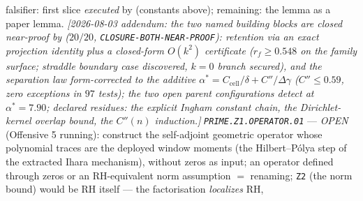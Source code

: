 \documentclass[11pt,a4paper]{article}
\begin{document}
falsifier: first slice \emph{executed} by
 (constants above); remaining:
the lemma as a paper lemma.  \emph{[2026-08-03 addendum: the two
named building blocks are closed near-proof by
 ($20/20$,
\texttt{CLOSURE-BOTH-NEAR-PROOF}): retention via an exact projection
identity plus a closed-form $O(k^2)$ certificate ($r_f\ge0.548$ on
the family surface; straddle boundary case discovered, $k=0$ branch
secured), and the separation law \emph{form-corrected} to the
additive $\alpha^*=C_{\mathrm{cell}}/\delta+C''/\Delta\gamma$
($C''\le0.59$, zero exceptions in $97$ tests); the two open parent
configurations detect at $\alpha^*=7.90$; declared residues: the
explicit Ingham constant chain, the Dirichlet-kernel overlap bound,
the $C''(n)$ induction.]}  \emph{\texttt{PRIME.Z1.OPERATOR.01}} ---
\emph{OPEN} (Offensive 5 running): construct the self-adjoint
geometric operator whose polynomial traces are the deployed window
moments (the Hilbert--P\'olya step of the extracted Ihara mechanism),
without zeros as input; an operator defined through zeros or an
RH-equivalent norm assumption $=$ renaming; \texttt{Z2} (the norm
bound) would be RH itself --- the factorisation \emph{localizes} RH,
\end{document}
